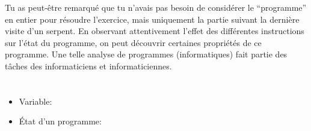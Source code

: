 {{Tu as peut-être remarqué que tu n’avais pas besoin de considérer le “programme” en entier pour résoudre l’exercice, mais uniquement la partie suivant la dernière visite d’un serpent. En observant attentivement l’effet des différentes instructions sur l’état du programme, on peut découvrir certaines propriétés de ce programme. Une telle analyse de programmes (informatiques) fait partie des tâches des informaticiens et informaticiennes.



\section*{\BrochureWebsitesAndKeywords}
{\raggedright
\begin{itemize}
  \item Variable: \href{https://fr.wikipedia.org/wiki/Variable_(informatique)}{}
  \item État d’un programme: \href{https://fr.wikipedia.org/wiki/\%C3\%89tat_(informatique)\#Processus}{}
\end{itemize}


}

}{}

\def\AuthorChanS{} %
\def\AuthorDagieneV{} %
\def\AuthorGaalB{} %
\def\AuthorDatzkoC{} %
\def\AuthorBaumannW{} %
\def\AuthorDatzkoThutS{} %
\def\AuthorPohlW{} %
\def\AuthorPelletE{} %

\newpage}{}
